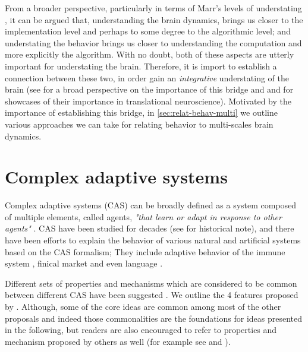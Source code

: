 From a broader perspective, particularly in terms of Marr's levels of understating \cite{marrUnderstandingComputationUnderstanding1979},
it can  be argued that, understanding the brain dynamics,
brings us closer to  the implementation level and perhaps to some degree to the algorithmic level;
and understating the behavior brings us closer to understanding the computation and more explicitly the algorithm.
With no doubt, both of these aspects are utterly important for understating the brain.
% 
% 
Therefore, it is import to establish a connection between these two, in order gain an \emph{integrative} understating of the brain
(see \citet[Chapter 2, Section 2]{churchlandComputationalBrain1992} for a broad perspective on the importance of this bridge and \citet{stephanTranslationalPerspectivesComputational2015} and \citet[Chapter 8]{forstmannIntroductionModelbasedCognitive2015} for showcases of their importance in  translational neuroscience).
Motivated by the importance of establishing this bridge,
in \autoref{sec:relat-behav-multi} we outline various approaches we can take for relating behavior to multi-scales brain dynamics.


\section{Complex adaptive systems}\label{sec:compl-adapt-syst}

Complex adaptive systems (CAS) can be broadly defined as a system composed of multiple elements, called agents,
\emph{"that learn or adapt in response to other agents"} \cite[Chapter 3]{hollandComplexityVeryShort2014}.
CAS have been studied for decades (see \citet{morowitzMindBrainComplex1995} for historical note),
and there have been efforts to explain the behavior of various natural and artificial systems based on the CAS formalism;
They include adaptive behavior of the immune system \cite{chowdhuryImmuneNetworkExample1999},
finical market \cite{hollandComplexityVeryShort2014}
and even language \cite{ellisLanguageComplexAdaptive2009}.

Different sets of properties and mechanisms which are considered to be common between different CAS have been suggested
\cite{brownleeComplexAdaptiveSystems2007}.
We outline the 4 features proposed by \citet{hollandStudyingComplexAdaptive2006}.
Although, some of the core ideas are common among most of the other proposals and indeed those commonalities are the foundations for ideas presented in the following,
but readers are also encouraged to refer to properties and mechanism proposed by others as well (for example see \citet{gell-mannComplexAdaptiveSystems1994} and \citet[Chapter 1]{arthurEconomyEvolvingComplex1997}).

